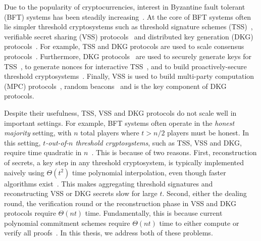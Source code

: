 
Due to the popularity of cryptocurrencies, interest in Byzantine fault tolerant (BFT) systems has been steadily increasing~\cite{bitcoin,ethereum,GAG+19,algorand,dfinity,ouroboros,ouroboros-praos,ouroboros-genesis,randherd}.
At the core of BFT systems often lie simpler threshold cryptosystems such as threshold signature schemes (TSS)~\cite{Boldyreva03,Shoup00}, verifiable secret sharing (VSS) protocols~\cite{Pedersen1991NonInteractive,CGMA85,KZG10a} and distributed key generation (DKG) protocols~\cite{Pedersen1991AThreshold,GJKR07,Kate2010}.
For example, TSS and DKG protocols are used to scale consensus protocols~\cite{GAG+19,dfinity,constantinople}.
Furthermore, DKG protocols~\cite{GJKR07} are used to securely generate keys for TSS~\cite{KG09}, to generate nonces for interactive TSS~\cite{SS01,GGN16}, and to build proactively-secure threshold cryptosystems~\cite{Herzberg1995ProactiveSecret,Herzberg1997ProactivePublic}.
Finally, VSS is used to build multi-party computation (MPC) protocols~\cite{GRR98p}, random beacons~\cite{randherd,CD17a,ouroboros} and is the key component of DKG protocols.

Despite their usefulness, TSS, VSS and DKG protocols do not scale well in important settings.
For example, BFT systems often operate in the \textit{honest majority} setting, with $n$ total players where $t > n/2$ players must be honest.
In this setting, \textit{$t$-out-of-$n$ threshold cryptosystems}, such as TSS, VSS and DKG, require time quadratic in $n$~\cite{Feldman87,Pedersen1991NonInteractive,KZG10a,Boldyreva03}.
This is because of two reasons.
First, reconstruction of secrets, a key step in any threshold cryptosystem, is typically implemented naively using $\Theta(t^2)$ time polynomial interpolation, even though faster algorithms exist~\cite{vG13ModernCh10}.
This makes aggregating threshold signatures and reconstructing VSS or DKG secrets slow for large $t$.
Second, either the dealing round, the verification round or the reconstruction phase in VSS and DKG protocols require $\Theta(nt)$ time.
Fundamentally, this is because current polynomial commitment schemes require $\Theta(nt)$ time to either compute or verify all proofs~\cite{Feldman87,Pedersen1991NonInteractive,KZG10a}.
In this thesis, we address both of these problems.

